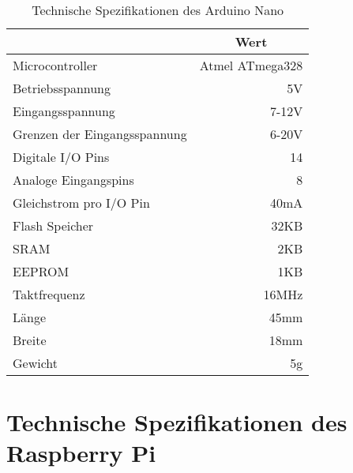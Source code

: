 \begin{table}[ht]
\caption{Technische Spezifikationen des Arduino Nano}
\begin{center}
\begin{tabular}{|l|r|}
\hline
\rowcolor{lightgray} \multicolumn{1}{|c|}{\textbf{Spezifikation}} & \multicolumn{1}{|c|}{\textbf{Wert}}\\
\hline
Microcontroller & Atmel ATmega328\\
\hline
Betriebsspannung & 5V\\
\hline
Eingangsspannung & 7-12V\\
\hline
Grenzen der Eingangsspannung & 6-20V\\
\hline
Digitale I/O Pins & 14\\
\hline
Analoge Eingangspins & 8\\
\hline
Gleichstrom pro I/O Pin & 40mA\\
\hline
Flash Speicher & 32KB\\
\hline
SRAM & 2KB \\
\hline
EEPROM & 1KB\\
\hline
Taktfrequenz & 16MHz\\
\hline
Länge & 45mm\\
\hline
Breite & 18mm\\
\hline
Gewicht & 5g\\
\hline
\end{tabular}
\end{center}
\label{tab:arduino}
\end{table}

\clearpage{}

\section{Technische Spezifikationen des Raspberry Pi}
\label{app:raspberry}

